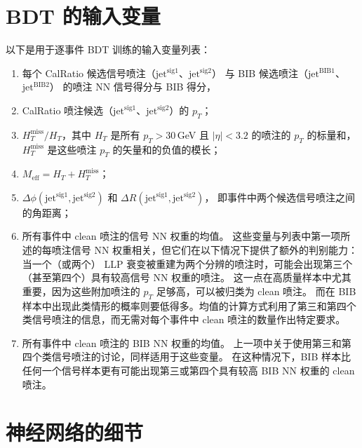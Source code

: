 \chapter{BDT 的输入变量}
\label{cpm:BDT}

以下是用于逐事件 BDT 训练的输入变量列表：

\begin{enumerate}
      \item 每个 CalRatio 候选信号喷注（$\text{jet}^{\text{sig}1}$、$\text{jet}^{\text{sig}2}$）
            与 BIB 候选喷注（$\text{jet}^{\text{BIB}1}$、$\text{jet}^{\text{BIB}2}$）
            的喷注 NN 信号得分与 BIB 得分，

      \item CalRatio 喷注候选（$\text{jet}^{\text{sig}1}$、$\text{jet}^{\text{sig}2}$）的 $p_T$；

      \item $H_T^{\text{miss}} / H_T$，其中 $H_T$ 是所有 $p_T > 30$\,GeV 且 $|\eta| < 3.2$ 的喷注的 $p_T$ 的标量和，
            $H_T^{\text{miss}}$ 是这些喷注 $p_T$ 的矢量和的负值的模长；

      \item $M_{\text{eff}} = H_T + H_T^{\text{miss}} $；

      \item $\Delta \phi (\text{jet}^{\text{sig}1}, \text{jet}^{\text{sig}2})$ 和
            $\Delta R(\text{jet}^{\text{sig}1}, \text{jet}^{\text{sig}2})$，
            即事件中两个候选信号喷注之间的角距离；

      \item 所有事件中 clean 喷注的信号 NN 权重的均值。
            这些变量与列表中第一项所述的每喷注信号 NN 权重相关，但它们在以下情况下提供了额外的判别能力：
            当一个（或两个） LLP 衰变被重建为两个分辨的喷注时，可能会出现第三个（甚至第四个）具有较高信号 NN 权重的喷注。
            这一点在高质量样本中尤其重要，因为这些附加喷注的 $p_T$ 足够高，可以被归类为 clean 喷注。
            而在 BIB 样本中出现此类情形的概率则要低得多。均值的计算方式利用了第三和第四个类信号喷注的信息，而无需对每个事件中 clean 喷注的数量作出特定要求。

      \item 所有事件中 clean 喷注的 BIB NN 权重的均值。
            上一项中关于使用第三和第四个类信号喷注的讨论，同样适用于这些变量。
            在这种情况下，BIB 样本比任何一个信号样本更有可能出现第三或第四个具有较高 BIB NN 权重的 clean 喷注。
\end{enumerate}


\chapter{神经网络的细节}
